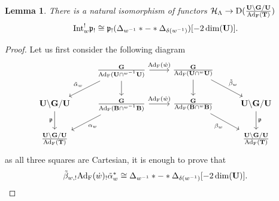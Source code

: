 \documentclass[article, 10pt, oneside, reqno]{amsart}
\theoremstyle{plain}
\newtheorem{lem}[thm]{Lemma}
\theoremstyle{definition}
\theoremstyle{remark}
\begin{document}
\begin{lem}\label{lem:intertwinning-operators}
There is a natural isomorphism of functors $\mathcal{H}_{\Lambda} \to \mathrm{D}(\frac{\mathbf{U} \backslash \mathbf{G} /\mathbf{U}}{\mathrm{Ad}_{\mathrm{F}}(\mathbf{T})})$ 
$$\mathrm{Int}_w^! \mathfrak{p}_! \cong \mathfrak{p}_!(\Delta_{w^{-1}} * - * \Delta_{\delta(w^{-1})})[-2\dim(\mathbf{U})].$$ 
\end{lem}

\begin{proof}
Let us first consider the following diagram 
\[\begin{tikzcd}
	& {\frac{\Gbf}{\Ad_{\Frob}(\Ubf \cap {^{w^{-1}}\Ubf})}} & {\frac{\Gbf}{\Ad_{\Frob}(\Ubf \cap {^{w}\Ubf})}} & \\
	{\Ubf \backslash\Gbf/\Ubf} & {\frac{\Gbf}{\Ad_{\Frob}(\Bbf \cap {^{w^{-1}}\Bbf})}} & {\frac{\Gbf}{\Ad_{\Frob}(\Bbf \cap {^{w}\Bbf})}} & {\Ubf \backslash\Gbf/\Ubf} \\
	{\frac{\Ubf \backslash \Gbf /\Ubf}{\Ad_{\Frob}(\Tbf)}} &&& {\frac{\Ubf \backslash \Gbf /\Ubf}{\Ad_{\Frob}(\Tbf)}}
	\arrow["{\Ad_{\Frob}(\dot{w})}", from=1-2, to=1-3]
	\arrow["{\tilde{\alpha}_w}"', from=1-2, to=2-1]
	\arrow[from=1-2, to=2-2]
	\arrow[from=1-3, to=2-3]
	\arrow["{\tilde{\beta}_w}", from=1-3, to=2-4]
	\arrow["\pfrak"', from=2-1, to=3-1]
	\arrow["{\Ad_{\Frob}(\dot{w})}", from=2-2, to=2-3]
	\arrow["{\alpha_w}", from=2-2, to=3-1]
	\arrow["{\beta_w}"', from=2-3, to=3-4]
	\arrow["\pfrak", from=2-4, to=3-4]
\end{tikzcd}\]
as all three squares are Cartesian, it is enough to prove that 
$$\tilde{\beta}_{w,!}\mathrm{Ad}_{\mathrm{F}}(\dot{w})_!\tilde{\alpha}_w^* \cong \Delta_{w^{-1}} * - * \Delta_{\delta(w^{-1})}[-2\dim(\mathbf{U})].$$


\end{proof}
\end{document}
